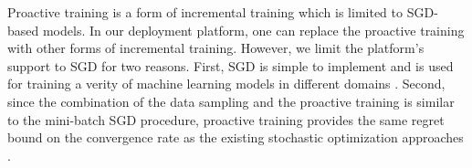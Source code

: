 Proactive training is a form of incremental training \cite{gepperth2016incremental} which is limited to SGD-based models.
In our deployment platform, one can replace the proactive training with other forms of incremental training.
However, we limit the platform's support to SGD for two reasons.
First, SGD is simple to implement and is used for training a verity of machine learning models in different domains \cite{ macmahan2013, bottou1995convergence, koren2009matrix,  funk2006netflix}. 
Second, since the combination of the data sampling and the proactive training is similar to the mini-batch SGD procedure, proactive training provides the same regret bound on the convergence rate as the existing stochastic optimization approaches \cite{zhang2004solving, kingma2014adam}.

%
%
